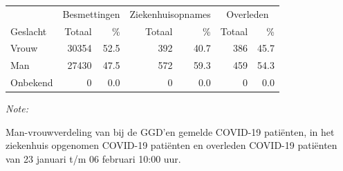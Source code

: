 \documentclass[
  english,
  man,floatsintext]{apa6}
\begin{document}
\begin{table}[H]
\centering\begingroup\fontsize{11}{13}\selectfont

\begin{threeparttable}
\begin{tabular}{lrrrrrr}
\toprule
\multicolumn{1}{c}{ } & \multicolumn{2}{c}{Besmettingen} & \multicolumn{2}{c}{Ziekenhuisopnames} & \multicolumn{2}{c}{Overleden} \\
\cmidrule(l{3pt}r{3pt}){2-3} \cmidrule(l{3pt}r{3pt}){4-5} \cmidrule(l{3pt}r{3pt}){6-7}
Geslacht & Totaal & \% & Totaal & \% & Totaal & \%\\
\midrule
Vrouw & 30354 & 52.5 & 392 & 40.7 & 386 & 45.7\\
Man & 27430 & 47.5 & 572 & 59.3 & 459 & 54.3\\
Onbekend & 0 & 0.0 & 0 & 0.0 & 0 & 0.0\\
\bottomrule
\end{tabular}
\begin{tablenotes}
\item \textit{Note: } 
\item Man-vrouwverdeling van bij de GGD’en gemelde COVID-19 patiënten, in het ziekenhuis opgenomen COVID-19 patiënten en overleden COVID-19 patiënten van 23 januari t/m 06 februari 10:00 uur.
\end{tablenotes}
\end{threeparttable}
\endgroup{}
\end{table}
\newpage
\end{document}
